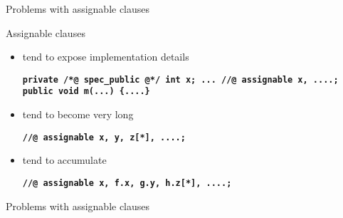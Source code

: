 \documentclass[
pdf,
nocolorBG,
slideColor,
erik,
]{prosper}
\newcommand{\code}[1]{{\rm \texttt{\textbf{\small #1}}}}
\begin{document}
\begin{slide}{Problems with assignable clauses}
\vspace*{-3ex}

Assignable clauses
\begin{itemize}
\item tend to expose implementation details
\begin{alltt}\code{\scriptsize  private /*@ spec_public @*/ int x;
  ...
  //@ assignable x, ....;
  public void m(...) \{....\} }
\end{alltt}
\item tend to become very long
\begin{alltt}\code{\scriptsize  //@ assignable x, y, z[*],  ....;}
\end{alltt}
\item tend to accumulate
\begin{alltt}\code{\scriptsize  //@ assignable x, f.x, g.y, h.z[*], ....;}
\end{alltt}
\end{itemize}
\end{slide}

\begin{slide}{Problems with assignable clauses}
\vspace*{-3ex}




\end{slide}
\end{document}
